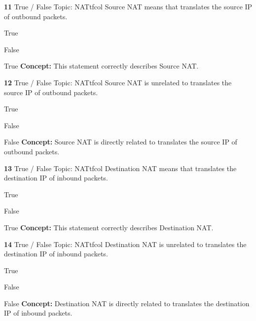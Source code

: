 \documentclass[10pt,a4paper]{article}
\begin{document}
\begin{qcard}{\color{white}\textbf{11} \hfill \small True / False \textbar{} Topic: NAT}{tfcol}
Source NAT means that translates the source IP of outbound packets.

\begin{qoptions}
\item True
\item False
\end{qoptions}
\begin{explainbox}{True}
\textbf{Concept:} This statement correctly describes Source NAT.
\end{explainbox}
\end{qcard}

\begin{qcard}{\color{white}\textbf{12} \hfill \small True / False \textbar{} Topic: NAT}{tfcol}
Source NAT is unrelated to translates the source IP of outbound packets.

\begin{qoptions}
\item True
\item False
\end{qoptions}
\begin{explainbox}{False}
\textbf{Concept:} Source NAT is directly related to translates the source IP of outbound packets.
\end{explainbox}
\end{qcard}

\begin{qcard}{\color{white}\textbf{13} \hfill \small True / False \textbar{} Topic: NAT}{tfcol}
Destination NAT means that translates the destination IP of inbound packets.

\begin{qoptions}
\item True
\item False
\end{qoptions}
\begin{explainbox}{True}
\textbf{Concept:} This statement correctly describes Destination NAT.
\end{explainbox}
\end{qcard}

\begin{qcard}{\color{white}\textbf{14} \hfill \small True / False \textbar{} Topic: NAT}{tfcol}
Destination NAT is unrelated to translates the destination IP of inbound packets.

\begin{qoptions}
\item True
\item False
\end{qoptions}
\begin{explainbox}{False}
\textbf{Concept:} Destination NAT is directly related to translates the destination IP of inbound packets.
\end{explainbox}
\end{qcard}
\end{document}
